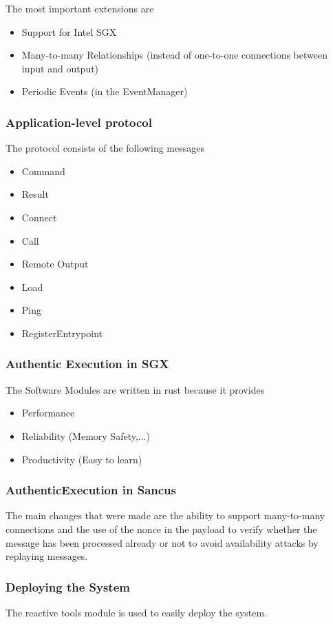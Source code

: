 \documentclass{article}
\begin{document}
The most important extensions are \begin{itemize}
\item Support for Intel SGX
\item Many-to-many Relationships (instead of one-to-one connections between input and output)
\item Periodic Events (in the EventManager)
\end{itemize}

\subsubsection{Application-level protocol}

The protocol consists of the following messages \begin{itemize}
\item Command
\item Result
\item Connect
\item Call
\item Remote Output
\item Load
\item Ping
\item RegisterEntrypoint
\end{itemize}

\subsubsection{Authentic Execution in SGX}

The Software Modules are written in rust because it provides \begin{itemize}
\item Performance
\item Reliability (Memory Safety,...)
\item Productivity (Easy to learn)
\end{itemize}

\subsubsection{AuthenticExecution in Sancus}

The main changes that were made are the ability to support many-to-many connections and the use of the nonce in the payload to verify whether the message has been processed already or not to avoid availability attacks by replaying messages.

\subsubsection{Deploying the System}

The reactive tools module is used to easily deploy the system.
\end{document}
